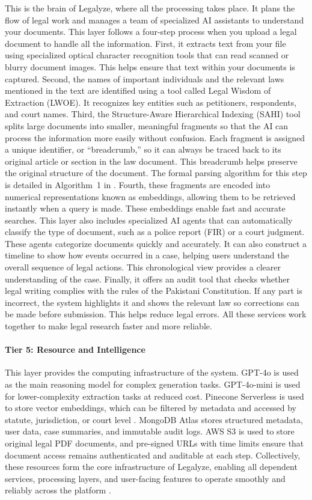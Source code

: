 This is the brain of Legalyze, where all the processing takes place. It plans the flow of legal work and manages a team of specialized AI assistants to understand your documents. This layer follows a four-step process when you upload a legal document to handle all the information. First, it extracts text from your file using specialized optical character recognition tools that can read scanned or blurry document images. This helps ensure that text within your documents is captured. Second, the names of important individuals and the relevant laws mentioned in the text are identified using a tool called Legal Wisdom of Extraction (LWOE). It recognizes key entities such as petitioners, respondents, and court names. Third, the Structure-Aware Hierarchical Indexing (SAHI) tool splits large documents into smaller, meaningful fragments so that the AI can process the information more easily without confusion. Each fragment is assigned a unique identifier, or ``breadcrumb,'' so it can always be traced back to its original article or section in the law document. This breadcrumb helps preserve the original structure of the document. The formal parsing algorithm for this step is detailed in Algorithm~1 in . Fourth, these fragments are encoded into numerical representations known as embeddings, allowing them to be retrieved instantly when a query is made. These embeddings enable fast and accurate searches. This layer also includes specialized AI agents that can automatically classify the type of document, such as a police report (FIR) or a court judgment. These agents categorize documents quickly and accurately. It can also construct a timeline to show how events occurred in a case, helping users understand the overall sequence of legal actions. This chronological view provides a clearer understanding of the case. Finally, it offers an audit tool that checks whether legal writing complies with the rules of the Pakistani Constitution. If any part is incorrect, the system highlights it and shows the relevant law so corrections can be made before submission. This helps reduce legal errors. All these services work together to make legal research faster and more reliable.

\paragraph{\textbf{Tier 5: Resource and Intelligence}}
This layer provides the computing infrastructure of the system. GPT-4o is used as the main reasoning model for complex generation tasks. GPT-4o-mini is used for lower-complexity extraction tasks at reduced cost. Pinecone Serverless is used to store vector embeddings, which can be filtered by metadata and accessed by statute, jurisdiction, or court level \cite{r600}. MongoDB Atlas stores structured metadata, user data, case summaries, and immutable audit logs. AWS S3 is used to store original legal PDF documents, and pre-signed URLs with time limits ensure that document access remains authenticated and auditable at each step. Collectively, these resources form the core infrastructure of Legalyze, enabling all dependent services, processing layers, and user-facing features to operate smoothly and reliably across the platform \cite{r605}.

